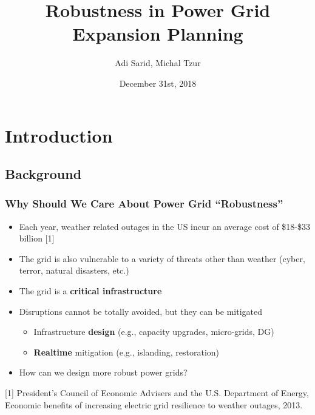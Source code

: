\documentclass{beamer}
\title[Robustness in Power Grid Planning]{Robustness in Power Grid Expansion Planning}
\author[Sarid, Tzur]{Adi Sarid, Michal Tzur}
\institute[Tel-Aviv University]{\normalsize Department of Industrial Engineering, Tel-Aviv University, Israel}
\date{December 31st, 2018}
\begin{document}
\begin{frame}
  \titlepage
\end{frame}


\section{Introduction}
\subsection{Background}
\begin{frame}
\frametitle{Why Should We Care About Power Grid ``Robustness''}
\begin{itemize}
	\item Each year, weather related outages in the US incur an average cost of \$18-\$33 billion [1]
	\item The grid is also vulnerable to a variety of threats other than weather (cyber, terror, natural disasters, etc.)
	\item The grid is a \textbf{critical infrastructure}
	\item Disruptions cannot be totally avoided, but they can be mitigated
	\begin{itemize}
		\item Infrastructure \textbf{design} (e.g., capacity upgrades, micro-grids, DG)
		\item \textbf{Realtime} mitigation (e.g., islanding, restoration)
	\end{itemize}
  \item How can we design more robust power grids?
\end{itemize}
\vspace{0.2in}
\tiny [1] President's Council of Economic Advisers and the U.S. Department of Energy, Economic benefits of increasing electric grid resilience to weather outages, 2013.
\end{frame}
\end{document}
